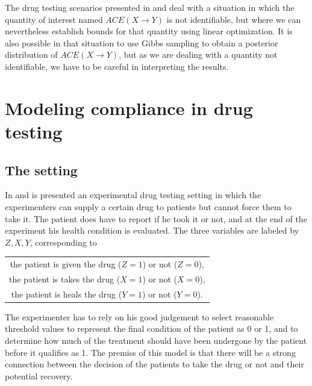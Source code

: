 \documentclass[a4paper, 10pt]{article}
\begin{document}
The drug testing scenarios presented in \cite{chickering1997cst} and
\cite{pearl2000cmr} deal with a situation
in which the quantity of interest named $ACE(X\rightarrow Y)$ is not
identifiable, but where we can nevertheless establish bounds for that quantity
using linear optimization. It is also possible in that situation to use Gibbs
sampling to obtain a posterior distribution of $ACE(X\rightarrow Y)$, but as we
are dealing with a quantity not identifiable, we have to be careful in
interpreting the results.


\section{Modeling compliance in drug testing}
\label{sec:drugtesting}

\subsection{The setting}

	In \cite{pearl2000cmr} and \cite{chickering1997cst} is presented an
experimental drug testing setting
in which the experimenters can supply a certain drug to patients but cannot
force them to take it. The patient does have to report if he took it or not, and
at the end of the experiment his health condition is evaluated. The three
variables are labeled by $Z,X,Y$, corresponding to

\begin{tabular}{c}
the patient is given the drug ($Z=1$) or not ($Z=0$), \\
the patient is takes the drug ($X=1$) or not ($X=0$), \\
the patient is heals the drug ($Y=1$) or not ($Y=0$).
\end{tabular}

The experimenter has to rely on his good judgement to select reasonable
threshold values to represent the final condition of the patient as 0 or 1, and
to determine how much of the treatment should have been undergone by the patient
before it qualifies as 1. The premiss of this model is that there
will be a strong connection between the decision of the patients to take the
drug or not and their potential recovery.
\end{document}
